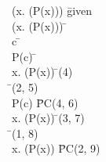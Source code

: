 \documentclass{article}
\begin{document}
\begin{proofbox}
\: \lnot (\forall x. (P(x))) \= \hbox{given} \\
\open
\: \lnot (\exists x. (\lnot P(x))) \= \asm \\
\open
\: c \= \forallintroconst \\
\open
\: \lnot P(c) \= \asm \\
\: \exists x. (\lnot P(x)) \= \existsintro(4) \\
\: \bot \= \notelim(2, 5) \\
\close
\: P(c) \= PC(4, 6) \\
\close
\: \forall x. (P(x)) \= \forallintro(3, 7) \\
\: \bot \= \notelim(1, 8) \\
\close
\: \exists x. (\lnot P(x)) \= PC(2, 9) \\
\end{proofbox}
\end{document}
